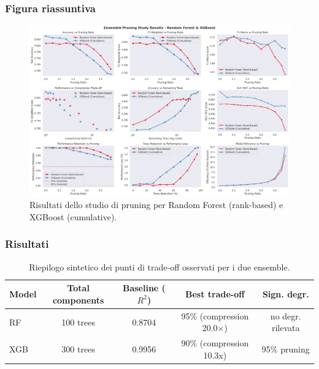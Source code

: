 \documentclass[a4paper,12pt]{report}
\begin{document}
	\subsubsection{Figura riassuntiva}
	\begin{figure}[H]
		\centering
		\includegraphics[width=\textwidth]{img/abl_xgbvsrf_pm.png}
		\caption{Risultati dello studio di pruning per Random Forest (rank-based) e XGBoost (cumulative).}
	\end{figure}
	
	\subsubsection{Risultati}
	\begin{table}[H]
		\centering
		\setlength{\tabcolsep}{4pt}
		\begin{tabular}{lcccc}
			\toprule
			\textbf{Model} & \textbf{Total components} & \textbf{Baseline (\(R^2\))} & \textbf{Best trade-off} & \textbf{Sign. degr.} \\
			\midrule
			RF        & 100 trees & 0.8704 & 95\% (compression 20.0×) & no degr. rilevata \\
			XGB       & 300 trees & 0.9956 & 90\% (compression 10.3x) & 95\% pruning \\
			\bottomrule
		\end{tabular}
		\caption{Riepilogo sintetico dei punti di trade-off osservati per i due ensemble.}
	\end{table}
	
\end{document}

